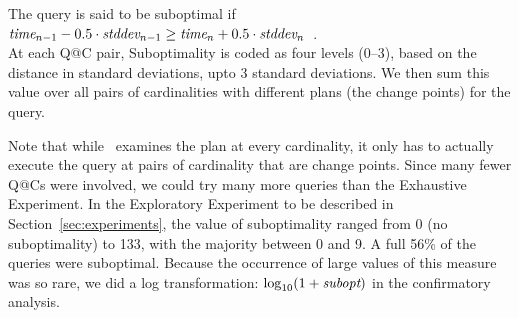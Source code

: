 \documentclass[prodmode,acmtods]{acmsmall}
\makeatletter
\def\azdb{\doubleblind{\hbox{\sc AZDBLab}}{\hbox{\sc DBLab}}}
\def\QatC{Q{@}C}
\makeatother
\begin{document}
The query is said to be suboptimal if
$\hbox{\em time}_{n-1} - 0.5 \cdot \hbox{\em stddev}_{n-1} \geq \hbox{\em
time}_n + 0.5 \cdot \hbox{\em stddev}_n$~.\\
At each Q@C pair, Suboptimality is coded as four levels (0--3), based on the distance in 
standard deviations, upto 3 standard deviations. 
We then sum this value over all pairs of cardinalities with different plans
(the change points) for the query.

Note that while \azdb\ examines the plan at every cardinality, it only has
to actually execute the query at pairs of cardinality that are change
points.  Since many fewer {\QatC}s were involved, we could try many more
queries than the \hbox{Exhaustive} Experiment. In the Exploratory Experiment to be
described in Section~\ref{sec:experiments}, the value of suboptimality ranged
from 0 (no suboptimality) to 133, with the majority between 0 and 9. A full 56\% of
the queries were suboptimal.  \hbox{Because} the occurrence of large values of this
measure was so rare, we did a log transformation: $\log_{10} (1 + \mbox{\em
  subopt})$ in the confirmatory analysis.
\end{document}
